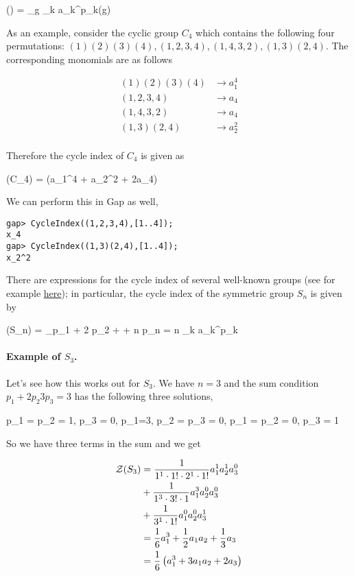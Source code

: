 \bee
\Zc(\Gc) =  \sum_{g \in \Gc} \prod_k a_k^{p_k(g)}
\eee

As an example, consider the cyclic group $C_4$ which contains the following four permutations: $(1)(2)(3)(4), (1,2,3,4), (1,4,3,2),(1,3)(2,4)$. The corresponding monomials are as follows

\begin{align*}
  (1)(2)(3)(4) &\rightarrow a_1^4 \\
  (1,2,3,4)  &\rightarrow a_4 \\
  (1,4,3,2)  &\rightarrow a_4 \\
  (1,3)(2,4) &\rightarrow a_2^2 \\
\end{align*}

Therefore the cycle index of $C_4$ is given as

\bee
\Zc(C_4) =  (a_1^4 + a_2^2 + 2a_4)
\eee

We can perform this in Gap as well,

\begin{verbatim}
gap> CycleIndex((1,2,3,4),[1..4]);
x_4
gap> CycleIndex((1,3)(2,4),[1..4]);
x_2^2
\end{verbatim}


There are expressions for the cycle index of several well-known groups (see for example \href{https://en.wikipedia.org/wiki/Cycle_index}{here}); in particular, the cycle index of the symmetric group $S_n$ is given by

\bee
\Zc(S_n) = \sum_{p_1 + 2 p_2 + \cdots + n p_n = n}  \prod_k a_k^{p_k}
\eee

\paragraph{Example of $S_3$.} Let's see how this works out for $S_3$. We have $n=3$ and the sum condition $p_1 + 2 p_2 3 p_3 = 3$ has the following three solutions,

\bee
p_1 = p_2 = 1, p_3 = 0, \quad p_1=3, p_2 = p_3 = 0, \quad p_1 = p_2 = 0, p_3 = 1
\eee

So we have three terms in the sum and we get

\begin{align*}
  \mathcal{Z}(S_3) &= \frac{1}{1^1 \cdot 1! \cdot 2^1 \cdot 1!} a_1^1 a_2^1 a_3^0 \\
           &+ \frac{1}{1^3 \cdot 3! \cdot 1} a_1^3 a_2^0 a_3^0 \\
           &+ \frac{1}{3^1 \cdot 1!} a_1^0 a_2^0 a_3^1 \\
           &= \frac{1}{6} a_1^3 + \frac{1}{2} a_1 a_2 + \frac{1}{3} a_3 \\
           &= \frac{1}{6} \left(a_1^3 + 3 a_1 a_2 + 2 a_3 \right)
\end{align*}


